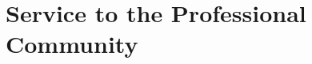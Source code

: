 \documentclass[10pt,letterpaper,final]{moderncv}
\begin{document}

\section{\textbf{Service to the Professional Community}}
\end{document}
